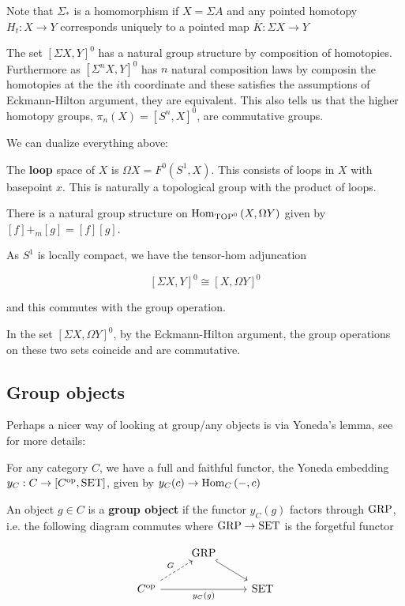 Note that $\Sigma_*$ is a homomorphism if $X=\Sigma A$ and any pointed homotopy $H_t:X\to Y$ corresponds uniquely to a pointed map $\overline K:\Sigma X\to Y$

The set $\left[\Sigma X,Y\right]^0$ has a natural group structure by composition of homotopies. Furthermore as $\left[\Sigma^nX,Y\right]^0$ has $n$ natural composition laws by composin the homotopies at the the $i$th coordinate and these satisfies the assumptions of Eckmann-Hilton argument, they are equivalent. This also tells us that the higher homotopy groups, $\pi_n(X)=\left[S^n,X\right]^0$, are commutative groups.

We can dualize everything above:

The \textbf{loop} space of $X$ is $\Omega X=F^0\left(S^1,X\right)$. This consists of loops in $X$ with basepoint $x$. This is naturally a topological group with the product of loops. 

There is a natural group structure on $\operatorname{Hom}_{\operatorname{TOP}^0}\left(X,\Omega Y\right)$ given by $[f]+_m[g]=[f][g]$.

As $S^1$ is locally compact, we have the tensor-hom adjuncation

\[\left[\Sigma X,Y\right]^0\cong\left[X,\Omega Y\right]^0\]

and this commutes with the group operation.

In the set $\left[\Sigma X,\Omega Y\right]^0$, by the Eckmann-Hilton argument, the group operations on these two sets coincide and are commutative.

\subsection{Group objects}

Perhaps a nicer way of looking at group/any objects is via Yoneda's lemma, see \cite{Waterhouse-Grp-schemes} for more details:

\begin{thm}[Yoneda]
    For any category $C$, we have a full and faithful functor, the Yoneda embedding $y_C:C\to\left[C^{\operatorname{op}},\operatorname{SET}\right]$, given by $y_C(c)\to\operatorname{Hom}_C\left(-,c\right)$
\end{thm}

An object $g\in C$ is a \textbf{group object} if the functor $y_C(g)$ factors through $\operatorname{GRP}$, i.e. the following diagram commutes where $\operatorname{GRP}\to\operatorname{SET}$ is the forgetful functor

\[\begin{tikzcd}
	& \GRP & \\
	{C^{\op}} && \SET \\
	\arrow[hook, from=1-2, to=2-3]
	\arrow["{y_C(g)}"', from=2-1, to=2-3]
	\arrow["G", dashed, from=2-1, to=1-2]
\end{tikzcd}\]

